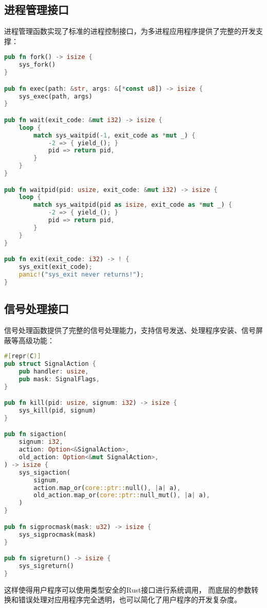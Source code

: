 \subsection{进程管理接口}

进程管理函数实现了标准的进程控制接口，为多进程应用程序提供了完整的开发支撑：

\begin{lstlisting}[language=Rust,caption={用户态进程管理}, label={lst:user-process-ops}]
pub fn fork() -> isize {
    sys_fork()
}

pub fn exec(path: &str, args: &[*const u8]) -> isize {
    sys_exec(path, args)
}

pub fn wait(exit_code: &mut i32) -> isize {
    loop {
        match sys_waitpid(-1, exit_code as *mut _) {
            -2 => { yield_(); }
            pid => return pid,
        }
    }
}

pub fn waitpid(pid: usize, exit_code: &mut i32) -> isize {
    loop {
        match sys_waitpid(pid as isize, exit_code as *mut _) {
            -2 => { yield_(); }
            pid => return pid,
        }
    }
}

pub fn exit(exit_code: i32) -> ! {
    sys_exit(exit_code);
    panic!("sys_exit never returns!");
}
\end{lstlisting}

\subsection{信号处理接口}

信号处理函数提供了完整的信号处理能力，支持信号发送、处理程序安装、信号屏蔽等高级功能：

\begin{lstlisting}[language=Rust,caption={用户态信号处理}, label={lst:user-signal-ops}]
#[repr(C)]
pub struct SignalAction {
    pub handler: usize,
    pub mask: SignalFlags,
}

pub fn kill(pid: usize, signum: i32) -> isize {
    sys_kill(pid, signum)
}

pub fn sigaction(
    signum: i32,
    action: Option<&SignalAction>,
    old_action: Option<&mut SignalAction>,
) -> isize {
    sys_sigaction(
        signum,
        action.map_or(core::ptr::null(), |a| a),
        old_action.map_or(core::ptr::null_mut(), |a| a),
    )
}

pub fn sigprocmask(mask: u32) -> isize {
    sys_sigprocmask(mask)
}

pub fn sigreturn() -> isize {
    sys_sigreturn()
}
\end{lstlisting}

这样使得用户程序可以使用类型安全的Rust接口进行系统调用，
而底层的参数转换和错误处理对应用程序完全透明，也可以简化了用户程序的开发复杂度。